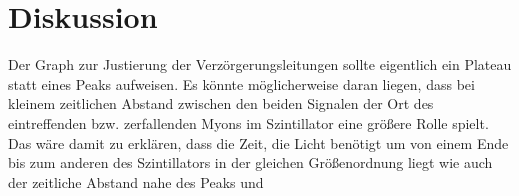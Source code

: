 \newpage
\section{Diskussion}
    Der Graph zur Justierung der Verzörgerungsleitungen sollte eigentlich ein Plateau statt eines Peaks aufweisen. Es könnte möglicherweise daran liegen, dass bei kleinem zeitlichen Abstand zwischen den beiden Signalen der Ort des eintreffenden bzw. zerfallenden Myons im Szintillator eine größere Rolle spielt. Das wäre damit zu erklären, dass die Zeit, die Licht benötigt um von einem Ende bis zum anderen des Szintillators in der gleichen Größenordnung liegt wie auch der zeitliche Abstand nahe des Peaks und 